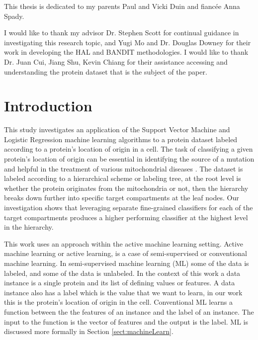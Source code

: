\documentclass[ms]{nuthesis}
\begin{document}
\begin{dedication}
  This thesis is dedicated to my parents Paul and Vicki Duin and fianc\'{e}e Anna Spady.
\end{dedication}

\begin{acknowledgments}
  I would like to thank my advisor Dr. Stephen Scott for continual guidance in investigating this
  research topic, and Yugi Mo and Dr. Douglas Downey for their work in developing the HAL and
  BANDIT methodologies. I would like to thank Dr. Juan Cui, Jiang Shu,
  Kevin Chiang for their assistance accessing and understanding the protein dataset that is
  the subject of the paper.
\end{acknowledgments}


{\small \tableofcontents}

\mainmatter

\chapter{Introduction}
This study investigates an application of the Support Vector Machine
and Logistic Regression machine learning algorithms to a protein dataset labeled
according to a protein's location of origin in a cell. The task of classifying
a given protein's location of origin can be essential in identifying the
source of a mutation and helpful in the treatment of various mitochondrial
diseases \cite{bioPoster}.
The dataset is labeled
according to a hierarchical scheme or labeling tree,
at the root level is whether the protein
 originates from the
mitochondria
or not, then the hierarchy breaks down further into specific target
compartments at the leaf nodes. Our investigation shows that leveraging separate
fine-grained classifiers for each of the target compartments produces a higher
performing classifier at the highest level in the hierarchy.

\par This work uses an approach within the active machine learning setting.
Active machine learning or active learning, is a case
of semi-supervised or conventional machine learning. In semi-supervised machine learning (ML)
some of the data is labeled, and some of the data is unlabeled. In the context of this work
a data instance is a single protein and its list of defining values or features. A data
instance also has a label which is the value that we want to learn, in our work this is the
 protein's location of origin in the cell. Conventional ML learns a function between the
 the features of an instance and the label of an instance. The input to the function is the vector
 of features and the output is the label. ML is discussed more
 formally in Section \ref{sect:machineLearn}.
\end{document}
